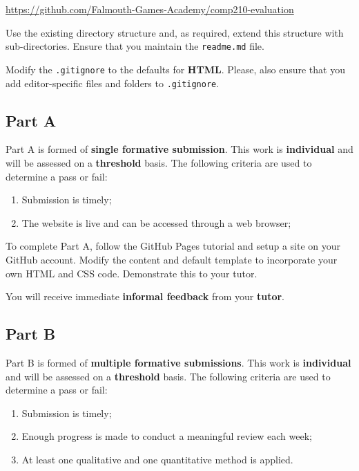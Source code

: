 \documentclass{../../fal_assignment}
\begin{document}
\indent \url{https://github.com/Falmouth-Games-Academy/comp210-evaluation}

Use the existing directory structure and, as required, extend this structure with sub-directories. Ensure that you maintain the \texttt{readme.md} file.

Modify the \texttt{.gitignore} to the defaults for \textbf{HTML}. Please, also ensure that you add editor-specific files and folders to \texttt{.gitignore}. 

\subsection*{Part A}

Part A is formed of \textbf{single formative submission}. This work is \textbf{individual} and will be assessed on a \textbf{threshold} basis. The following criteria are used to determine a pass or fail:

\begin{enumerate}[label=(\alph*)]
	\item Submission is timely;
	\item The website is live and can be accessed through a web browser;
\end{enumerate}

To complete Part A, follow the GitHub Pages tutorial and setup a site on your GitHub account.  Modify the content and default template to incorporate your own HTML and CSS code. Demonstrate this to your tutor.

You will receive immediate \textbf{informal feedback} from your \textbf{tutor}.

\subsection*{Part B}

Part B is formed of \textbf{multiple formative submissions}. This work is \textbf{individual} and will be assessed on a \textbf{threshold} basis. The following criteria are used to determine a pass or fail:

\begin{enumerate}[label=(\alph*)]
	\item Submission is timely;
	\item Enough progress is made to conduct a meaningful review each week;
	\item At least one qualitative and one quantitative method is applied.
\end{enumerate}
\end{document}
